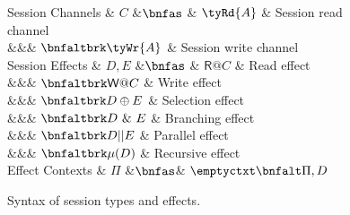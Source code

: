 \begin{figure}
\begin{grammar}
  Session Channels
  & $C$
      &$\bnfas$ & 
             $\tyRd{A}$ & Session read channel
      \\ &&& $\bnfaltbrk \tyWr{A}$ & Session write channel
  \\[1ex]
  Session Effects
  & $D, E$
      &$\bnfas$ & 
             $\mathsf{R}@C$ & Read effect
      \\ &&& $\bnfaltbrk \mathsf{W}@C$ & Write effect
      \\ &&& $\bnfaltbrk D \oplus E$ & Selection effect
      \\ &&& $\bnfaltbrk D\ \&\ E$ & Branching effect
      \\ &&& $\bnfaltbrk D || E$ & Parallel effect
      \\ &&& $\bnfaltbrk \mu(D)$ & Recursive effect
  \\[1ex]
  Effect Contexts
  & $\Pi$
     &$\bnfas$& $\emptyctxt \bnfalt \Pi,D$
\end{grammar}
  \caption{Syntax of session types and effects.}
  \label{fig:syntax-session-types}
\end{figure}
